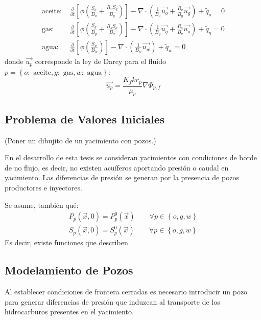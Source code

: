 \begin{align}
\label{aceite}
\text{aceite: }&\frac{\partial}{\partial t} \left[ \phi \left( \frac{S_{o}}{B_{o}} + \frac{R_{v} S_{g}}{B_{g}} \right) \right]
- \nabla \cdot \left( \frac{1}{B_{o}} \vec{u_{o}} + \frac{R_{v}}{B_{g}} \vec{u_{g}} \right) + \tilde{q}_{o}=0  \\
\label{gas}
\text{gas: }&\frac{\partial}{\partial t} \left[ \phi \left( \frac{S_{g}}{B_{g}} + \frac{R_{s} S_{o}}{B_{o}} \right) \right]
- \nabla \cdot \left( \frac{1}{B_{g}} \vec{u_{g}} + \frac{R_{s}}{B_{o}} \vec{u_{o}} \right) + \tilde{q}_{g} = 0 \\
\label{agua}
\text{agua: }&\frac{\partial}{\partial t} \left[\phi \left( \frac{S_{w}}{B_{w}} \right) \right] - \nabla \cdot \left( \frac{1}{B_{w}} \vec{u_{w}} \right) + \tilde{q}_{w} = 0 
\end{align}
donde $\vec{u_{p}}$ corresponde la ley de Darcy para el fluido $p = \left\lbrace o:\text{ aceite}, g:\text{ gas}, w:\text{ agua} \right\rbrace $:
\begin{equation*}
\vec{u_{p}}=\frac{K_{f}kr_{p}}{\mu_{p} } \nabla{\Phi_{p,f}}
\end{equation*}



\subsection{Problema de Valores Iniciales}

(Poner un dibujito de un yacimiento con pozos.)

En el desarrollo de esta tesis se consideran yacimientos con condiciones de borde de no flujo, es decir, no existen acuíferos aportando presión o caudal en yacimiento. Las diferencias de presión se generan por la presencia de pozos productores e inyectores.

Se asume, también qué:
\begin{align}
	P_{p}(\vec{x},0) = P^{0}_{p}(\vec{x}) \qquad \forall p \in \left\lbrace o,g,w\right\rbrace\\
	S_{p}(\vec{x},0) = S^{0}_{p}(\vec{x}) \qquad \forall p \in \left\lbrace o,g,w\right\rbrace
\end{align}
%
Es decir, existe funciones que describen 

\subsection{Modelamiento de Pozos}
%
Al establecer condiciones de frontera cerradas es necesario introducir un pozo para generar diferencias de presión que induzcan al transporte de los hidrocarburos presentes en el yacimiento.  

